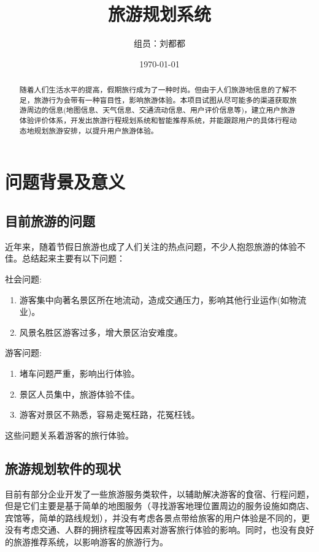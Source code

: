 \documentclass[titlepage]{article}
\begin{document}

\title{旅游规划系统}
\author{组员：刘都都}
\date{\today}
\maketitle
\begin{abstract}
\quad \quad 随着人们生活水平的提高，假期旅行成为了一种时尚。但由于人们旅游地信息的了解不足，旅游行为会带有一种盲目性，影响旅游体验。本项目试图从尽可能多的渠道获取旅游周边的信息(地图信息、天气信息、交通流动信息、用户评价信息等)，建立用户旅游体验评价体系，开发出旅游行程规划系统和智能推荐系统，并能跟踪用户的具体行程动态地规划旅游安排，以提升用户旅游体验。
\end{abstract}
\tableofcontents
\newpage
\section{问题背景及意义}
\subsection{目前旅游的问题}
近年来，随着节假日旅游也成了人们关注的热点问题，不少人抱怨旅游的体验不佳。总结起来主要有以下问题：

社会问题:
\begin{enumerate}
\item 游客集中向著名景区所在地流动，造成交通压力，影响其他行业运作(如物流业)。
\item 风景名胜区游客过多，增大景区治安难度。
\end{enumerate}

游客问题:
\begin{enumerate}
\item 堵车问题严重，影响出行体验。
\item 景区人员集中，旅游体验不佳。
\item 游客对景区不熟悉，容易走冤枉路，花冤枉钱。
\end{enumerate}


这些问题关系着游客的旅行体验。
\subsection{旅游规划软件的现状}
目前有部分企业开发了一些旅游服务类软件，以辅助解决游客的食宿、行程问题，但是它们主要是基于简单的地图服务（寻找游客地理位置周边的服务设施如商店、宾馆等，简单的路线规划），并没有考虑各景点带给旅客的用户体验是不同的，更没有考虑交通、人群的拥挤程度等因素对游客旅行体验的影响。同时，也没有良好的旅游推荐系统，以影响游客的旅游行为。
\end{document}
